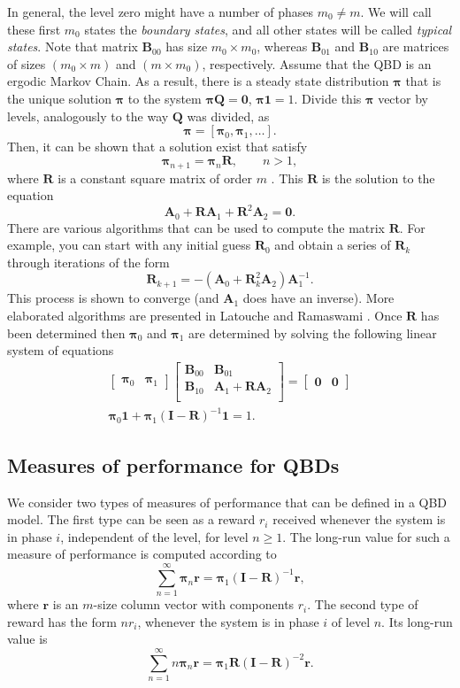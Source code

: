 \documentclass[11pt,letterpaper]{article}
\newcommand{\bA}{{\mathbf A}}
\newcommand{\bB}{{\mathbf B}}
\newcommand{\bQ}{{\mathbf Q}}
\newcommand{\bR}{{\mathbf R}}
\newcommand{\one}{{\mathbf 1}}
\newcommand{\zero}{{\mathbf 0}}
\newcommand{\bpi}{{\boldsymbol{\pi}}}
\newcommand{\bI}{{\mathbf I}}
\newcommand{\br}{\mathbf{r}}
\begin{document}
In general, the level zero might have a number of phases $m_0\neq m$. We will
call these first $m_0$ states the \textit{boundary states}, and all other states
will be called \textit{typical states}. Note that matrix $\bB_{00}$ has size
$m_0\times m_0$, whereas $\bB_{01}$ and $\bB_{10}$ are matrices of sizes
$(m_0\times m)$ and $(m \times m_0)$, respectively. Assume that the QBD is an
ergodic Markov Chain. As a result, there is a steady state distribution $\bpi$
that is the unique solution $\bpi$ to the system $\bpi \bQ = \zero$,
$\bpi \one = 1$.  Divide this $\bpi$ vector by levels, analogously to the way
$\bQ$ was divided, as
\[ \bpi = [ \bpi_0, \bpi_1,\ldots]. \]
Then, it can be shown that a solution exist that satisfy
\[  \bpi_{n+1}= \bpi_n\bR, \qquad n > 1,\]
where $\bR$ is a constant square matrix of order $m$ \cite{neut81}.
This $\bR$ is the solution to the equation
\[ \bA_0 + \bR\bA_1 + \bR^2\bA_2 = \zero. \]
There are various algorithms that can be used to compute the matrix $\bR$. For
example, you can start with any initial guess $\bR_0$ and obtain a series of
$\bR_k$ through iterations of the form
\[ \bR_{k+1} = -(\bA_0 + \bR^2_k\bA_2 )\bA_1^{-1}. \]
This process is shown to converge (and $\bA_1$ does have an
inverse). More elaborated algorithms are presented in  Latouche
and Ramaswami \cite{lato.rama99}. Once $\bR$ has been determined
then $\bpi_0$ and $\bpi_1$ are determined by solving the following
linear system of equations
\begin{gather*}
        \begin{bmatrix}
            \bpi_0 & \bpi_1
        \end{bmatrix}
        \begin{bmatrix}
        \bB_{00} & \bB_{01}\\
        \bB_{10} & \bA_1 + \bR\bA_2\\
        \end{bmatrix}
         =
        \begin{bmatrix}
            \zero  & \zero
        \end{bmatrix}
\\
         \bpi_0 \one + \bpi_1(\bI-\bR)^{-1}\one = 1.
\end{gather*}

\subsection{Measures of performance for QBDs}
We consider two types of measures of performance that can be defined in a QBD
model. The first type can be seen as a reward $r_i$ received whenever the system
is in phase $i$, independent of the level, for level $n\ge1$. The long-run value
for such a measure of performance is computed according to
\[ \sum_{n=1}^\infty \bpi_n \br = \bpi_1(\bI-\bR)^{-1}\br, \]
where $\br$ is an $m$-size column vector with components $r_i$. The second type
of reward has the form $nr_i$, whenever the system is in phase $i$ of level
$n$. Its long-run value is
\[\sum_{n=1}^\infty n \bpi_n \br = \bpi_1\bR(\bI-\bR)^{-2}\br. \]
\addtolength{\textheight}{-0cm}
\end{document}
